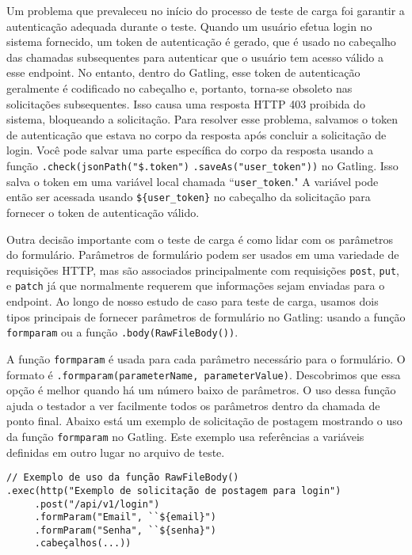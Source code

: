 \begin{tabela}[h]
\begin{tabela}[!t]
Um problema que prevaleceu no início do processo de teste de carga foi garantir a autenticação adequada durante o teste. Quando um usuário efetua login no sistema fornecido, um token de autenticação é gerado, que é usado no cabeçalho das chamadas subsequentes para autenticar que o usuário tem acesso válido a esse endpoint. No entanto, dentro do Gatling, esse token de autenticação geralmente é codificado no cabeçalho e, portanto, torna-se obsoleto nas solicitações subsequentes. Isso causa uma resposta HTTP 403 proibida do sistema, bloqueando a solicitação. Para resolver esse problema, salvamos o token de autenticação que estava no corpo da resposta após concluir a solicitação de login. Você pode salvar uma parte específica do corpo da resposta usando a função \texttt{.check(jsonPath("\$.token")} \texttt{.saveAs("user\_token"))} no Gatling. Isso salva o token em uma variável local chamada ``\texttt{user\_token}." A variável pode então ser acessada usando \texttt{\$\{user\_token\}} no cabeçalho da solicitação para fornecer o token de autenticação válido.

Outra decisão importante com o teste de carga é como lidar com os parâmetros do formulário. Parâmetros de formulário podem ser usados em uma variedade de requisições HTTP, mas são associados principalmente com requisições \texttt{post}, \texttt{put}, e \texttt{patch} já que normalmente requerem que informações sejam enviadas para o endpoint. Ao longo de nosso estudo de caso para teste de carga, usamos dois tipos principais de fornecer parâmetros de formulário no Gatling: usando a função \texttt{formparam} ou a função \texttt{.body(RawFileBody())}.

A função \texttt{formparam} é usada para cada parâmetro necessário para o formulário. O formato é \texttt{.formparam(parameterName, parameterValue)}. Descobrimos que essa opção é melhor quando há um número baixo de parâmetros. O uso dessa função ajuda o testador a ver facilmente todos os parâmetros dentro da chamada de ponto final. Abaixo está um exemplo de solicitação de postagem mostrando o uso da função \texttt{formparam} no Gatling. Este exemplo usa referências a variáveis definidas em outro lugar no arquivo de teste.

\begin{lstlisting}
// Exemplo de uso da função RawFileBody()
.exec(http("Exemplo de solicitação de postagem para login")
     .post("/api/v1/login")
     .formParam("Email", ``${email}")
     .formParam("Senha", ``${senha}")
     .cabeçalhos(...))
\end{lstlisting}


\end{tabela}
\end{tabela}

